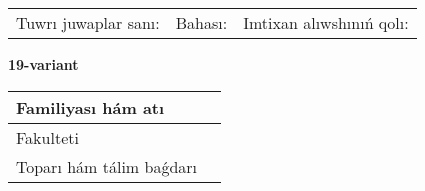 \documentclass{article}
\begin{document}
\vspace{1cm}

\begin{tabular}{lll}
Tuwrı juwaplar sanı: \underline{\hspace{1.5cm}} & 
Bahası: \underline{\hspace{1.5cm}} & 
Imtixan alıwshınıń qolı: \underline{\hspace{2cm}} \\
\end{tabular}

\egroup

\newpage


\textbf{19-variant}\\

\bgroup
\def\arraystretch{1.6} %

\begin{tabular}{|m{5.7cm}|m{9.5cm}|}
\hline
Familiyası hám atı & \\
\hline
Fakulteti  & \\
\hline
Toparı hám tálim baǵdarı  & \\
\hline
\end{tabular}

\vspace{1cm}
\end{document}
